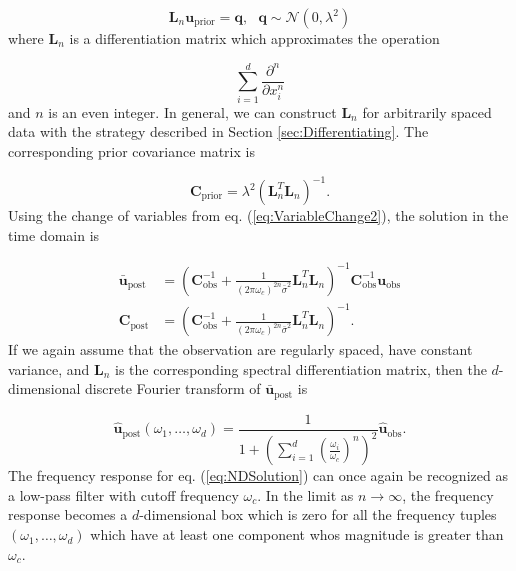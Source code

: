 \documentclass[10pt,a4paper]{article}
\begin{document}
\begin{equation}
  \mathbf{L}_n \mathbf{u}_\mathrm{prior} = \mathbf{q}, \ \ \ \mathbf{q} \sim \mathcal{N}(0,\lambda^2)
\end{equation}  
where $\mathbf{L}_n$ is a differentiation matrix which approximates the operation 

\begin{equation}
  \sum_{i=1}^d\frac{\partial^n}{\partial x_i^n} 
\end{equation} 
and $n$ is an even integer. In general, we can construct $\mathbf{L}_n$ for arbitrarily spaced data with the strategy described in Section \ref{sec:Differentiating}. The corresponding prior covariance matrix is

\begin{equation}\label{eq:NDCovariance}
\mathbf{C}_\mathrm{prior} = \lambda^2\left(\mathbf{L}_n^T\mathbf{L}_n\right)^{-1}. 
\end{equation}           
Using the change of variables from eq. (\ref{eq:VariableChange2}), the solution in the time domain is

\begin{equation}\label{eq:NDSolution}
\begin{split}
\mathbf{\bar{u}}_\mathrm{post} &= (\mathbf{C}_\mathrm{obs}^{-1} +   
                   \frac{1}{(2\pi\omega_c)^{2n}\bar{\sigma}^2}\mathbf{L}_n^T\mathbf{L}_n)^{-1}\mathbf{C}_\mathrm{obs}^{-1}
                   \mathbf{u}_\mathrm{obs}
\\
\mathbf{C}_\mathrm{post} &= (\mathbf{C}_\mathrm{obs}^{-1} +   
                            \frac{1}{(2\pi\omega_c)^{2n}\bar{\sigma}^2}\mathbf{L}_n^T\mathbf{L}_n)^{-1}.
\end{split}
\end{equation}
If we again assume that the observation are regularly spaced, have constant variance, and $\mathbf{L}_n$ is the corresponding spectral differentiation matrix, then the $d$-dimensional discrete Fourier transform of $\mathbf{\bar{u}}_\mathrm{post}$ is 

\begin{equation}\label{eq:NDFourierSoln}
  \mathbf{\hat{u}}_\mathrm{post}(\omega_1, \dots, \omega_d) = 
  \frac{1}{1 + \left(\sum_{i=1}^d \left(\frac{\omega_i}{\omega_c}\right)^n\right)^2} \mathbf{\hat{u}}_\mathrm{obs}.
\end{equation}
The frequency response for eq. (\ref{eq:NDSolution}) can once again be recognized as a low-pass filter with cutoff frequency $\omega_c$.  In the limit as $n \to \infty$, the frequency response becomes a $d$-dimensional box which is zero for all the frequency tuples $(\omega_1,\dots,\omega_d)$ which have at least one component whos magnitude is greater than $\omega_c$.
\end{document}
